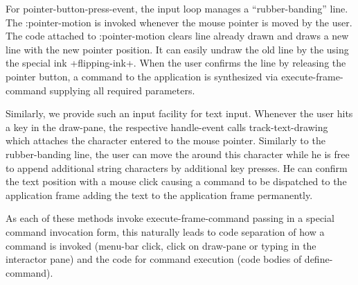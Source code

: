 \documentclass[twocolumn,a4paper]{article}
\newcommand {\code}[1]{{\sffamily #1}}
\let\class\code
\let\method\code
\let\constant\code
\let\keyword\code
\begin{document}
For \class{pointer-button-press-event}, the input loop manages a
``rubber-banding'' line. The \keyword{:pointer-motion} is invoked
whenever the mouse pointer is moved by the user. The code attached to
\keyword{:pointer-motion} clears line already drawn and draws a new
line with the new pointer position. It can easily undraw the old line
by the using the special ink \constant{+flipping-ink+}. When the user
confirms the line by releasing the pointer button, a command to the
application is synthesized via \method{execute-frame-command}
supplying all required parameters.

Similarly, we provide such an input facility for text input. Whenever
the user hits a key in the draw-pane, the respective
\method{handle-event} calls \method{track-text-drawing} which attaches
the character entered to the mouse pointer. Similarly to the
rubber-banding line, the user can move the around this character while
he is free to append additional string characters by additional key
presses. He can confirm the text position with a mouse click causing a
command to be dispatched to the application frame adding the text to
the application frame permanently.

As each of these methods invoke \code{execute-frame-command} passing
in a special command invocation form, this naturally leads to code
separation of how a command is invoked (menu-bar click, click on
draw-pane or typing in the interactor pane) and the code for command
execution (code bodies of \method{define-command}).
\end{document}
